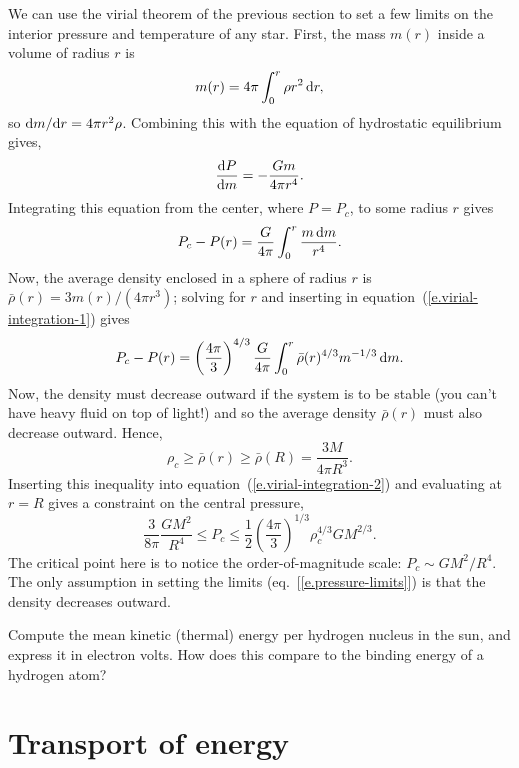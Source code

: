 We can use the virial theorem of the previous section to set a few limits on the interior pressure and temperature of any star.  First, the mass $m(r)$ inside a volume of radius $r$ is
\[ m(r) = 4\pi\int_{0}^{r} \rho r^{2}\,\mathrm{d} r, \]
so $\mathrm{d} m/\mathrm{d} r = 4\pi r^{2}\rho$. Combining this with the equation of hydrostatic equilibrium gives,
\[
\frac{\mathrm{d} P}{\mathrm{d} m} = -\frac{G m}{4\pi r^{4}}.
\]
Integrating this equation from the center, where $P = P_{c}$, to some radius $r$ gives
\begin{equation}\label{e.virial-integration-1}
P_{c} - P(r) = \frac{G}{4\pi}\int_{0}^{r} \frac{m \,\mathrm{d} m}{r^{4}}.
\end{equation}
Now, the average density enclosed in a sphere of radius $r$ is $\bar{\rho}(r) = 3m(r)/(4\pi r^{3})$; solving for $r$ and inserting in equation~(\ref{e.virial-integration-1}) gives
\begin{equation}\label{e.virial-integration-2}
P_{c} - P(r) = \left(\frac{4\pi}{3}\right)^{4/3} \frac{G}{4\pi}\int_{0}^{r} \bar{\rho}(r)^{4/3} m^{-1/3}\,\mathrm{d} m.
\end{equation}
Now, the density must decrease outward if the system is to be stable (you can't have heavy fluid on top of light!) and so the average density $\bar{\rho}(r)$ must also decrease outward. Hence,
\[ \rho_{c} \ge \bar{\rho}(r) \ge \bar{\rho}(R) = \frac{3M}{4\pi R^{3}}.\]
Inserting this inequality into equation~(\ref{e.virial-integration-2}) and evaluating at $r=R$ gives a constraint on the central pressure,
\begin{equation}\label{e.pressure-limits}
\frac{3}{8\pi} \frac{GM^{2}}{R^{4}} \le P_{c} \le \frac{1}{2} \left(\frac{4\pi}{3}\right)^{1/3} \rho_{c}^{4/3}G M^{2/3}.
\end{equation}
The critical point here is to notice the order-of-magnitude scale: $P_{c}\sim GM^{2}/R^{4}$. The only assumption in setting the limits (eq.~[\ref{e.pressure-limits}]) is that the density decreases outward.

\begin{exercisebox}
Compute the mean kinetic (thermal) energy per hydrogen nucleus in the sun, and express it in electron volts. How does this compare to the binding energy of a hydrogen atom?
\end{exercisebox}

\section{Transport of energy}\label{s.energy-transport-estimate}

